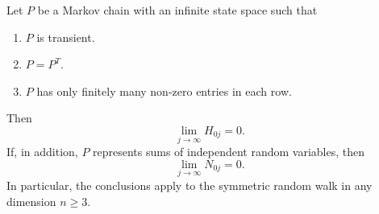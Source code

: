 Let $P$ be a Markov chain with an infinite state space such that
\begin{enumerate}
\item[(1)] $P$ is transient.
\item[(2)] $P = P^T$.
\item[(3)] $P$ has only finitely many non-zero entries in each row.
\end{enumerate}
Then
$$\lim_{j \to \infty} H_{0j} = 0.$$
If, in addition, $P$ represents sums of independent random variables, then
$$\lim_{j \to \infty} N_{0j} = 0.$$
In particular, the conclusions apply to the symmetric random walk in any dimension $n \geq 3$.
